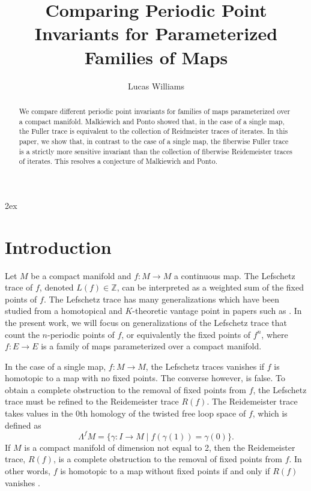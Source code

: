 \documentclass[11pt]{amsart}
\title{Comparing Periodic Point Invariants for Parameterized Families of Maps}
\author{Lucas Williams}
\newcommand{\Z}{\mathbb{Z}}
\theoremstyle{plain}   %
\theoremstyle{definition}
\theoremstyle{remark}
\numberwithin{equation}{section}
\begin{document}
\begin{abstract}
	We compare different periodic point invariants for families of maps parameterized over a compact manifold. Malkiewich and Ponto showed that, in the case of a single map, the Fuller trace is equivalent to the collection of Reidmeister traces of iterates. In this paper, we show that, in contrast to the case of a single map, the fiberwise Fuller trace is a strictly more sensitive invariant than the collection of fiberwise Reidemeister traces of iterates. This resolves a conjecture of Malkiewich and Ponto.  
\end{abstract}

\maketitle

\setcounter{tocdepth}{2}
\tableofcontents

\parskip 2ex

\section{Introduction}

Let $M$ be a compact manifold and $f\colon M\to M$ a continuous map. The Lefschetz trace of $f$, denoted $L(f)\in \Z$, can be interpreted as a weighted sum of the fixed points of $f$. The Lefschetz trace has many generalizations which have been studied from a homotopical and $K$-theoretic vantage point in papers such as \cite{dold_puppe, klein_williams, mp2, ponto_asterisque, gn_ktheory}. In the present work, we will focus on generalizations of the Lefschetz trace that count the $n$-periodic points of $f$, or equivalently the fixed points of $f^n$, where $f\colon E\to E$ is a family of maps parameterized over a compact manifold. 

In the case of a single map, $f\colon M\to M$, the Lefschetz traces vanishes if $f$ is homotopic to a map with no fixed points. The converse however, is false. To obtain a complete obstruction to the removal of fixed points from $f$, the Lefschetz trace must be refined to the Reidemeister trace $R(f)$.  The Reidemeister trace takes values in the 0th homology of the twisted free loop space of $f$, which is defined as
\[
\Lambda^fM= \{\gamma\colon I\to M\mid f(\gamma(1)) = \gamma(0)\}.
\]
If $M$ is a compact manifold of dimension not equal to 2, then the Reidemeister trace, $R(f)$, is a complete obstruction to the removal of fixed points from $f$. In other words, $f$ is homotopic to a map without fixed points if and only if $R(f)$ vanishes \cite{jiang80, wecken}.
\end{document}
